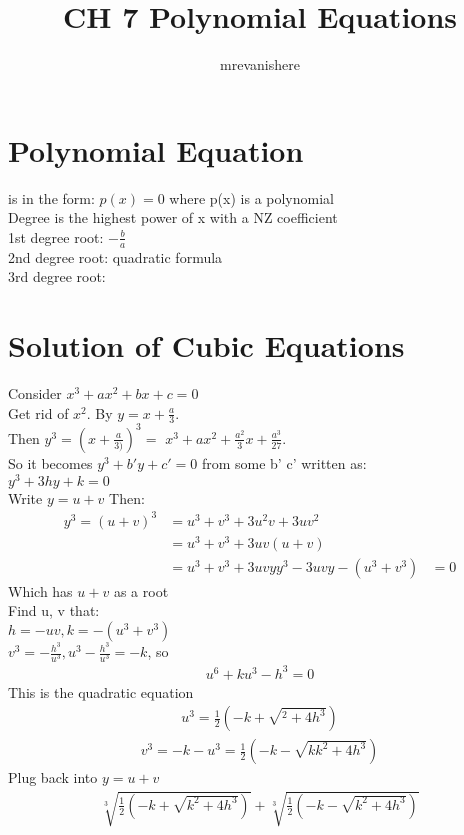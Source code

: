 \documentclass[12pt]{article}
\begin{document}
\title{CH 7 Polynomial Equations}
\author{mrevanishere}
\maketitle


\section{Polynomial Equation}
	is in the form: $ p(x) = 0 $ where p(x) is a polynomial\\
	Degree is the highest power of x with a NZ coefficient \\
	1st degree root: $ -\frac{b}{a} $ \\
	2nd degree root: quadratic formula \\
	3rd degree root:
\section{Solution of Cubic Equations}
	Consider $ x^3  + ax^2 + bx + c = 0 $ \\
	Get rid of $ x^2 $. By $ y = x+\frac{a}{3} $. \\
	Then $ y^3  =  (x +\frac{a}{3)})^3 = $
	$ x^3 + ax^2 + \frac{a^2}{3}x + \frac{a^3}{27} $. \\
	So it becomes $ y^3 + b'y + c' = 0 $ from some b' c' written as:\\
	$ y^3 + 3hy +k =0 $ \\
	Write $ y = u + v $ Then:
	\begin{align*}
		y^3 = (u+v)^3 &=  u^3 + v^3 + 3u^2v + 3uv^2 \\
					  &=  u^3 + v^3 + 3uv(u+v) \\
					  &= u^3 + v^3 + 3uvy
		y^3 - 3uvy - (u^3 + v^3) &= 0
	\end{align*}
	Which has $ u+v $ as a root \\
	Find u, v that: \\
	$ h = -uv, k = -(u^3 + v^3) $ \\
	$ v^3 = -\frac{h^3}{u^3}, u^3 - \frac{h^3}{u^3} = -k $, so
	\begin{align*}
		u^6 + ku^3 -h^3 = 0
	\end{align*}
	This is the quadratic equation
	\begin{align*}
		u^3 =  \frac{1}{2}(-k +\sqrt{^2 + 4h^3})
	\end{align*}
	\begin{align*}
		v^3 =  -k-u^3 = \frac{1}{2}(-k-\sqrt{kk^2+4h^3})
	\end{align*}
	Plug back into $ y= u+v $
	\begin{align*}
	\sqrt[3]{\frac{1}{2}(-k+\sqrt{k^2+4h^3} )} + 
		\sqrt[3]{\frac{1}{2}(-k-\sqrt{k^2+4h^3} )}
	\end{align*}
\end{document}
